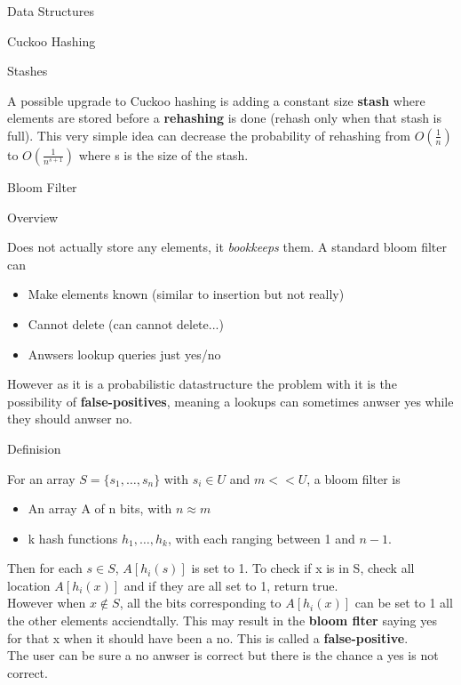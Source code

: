 \documentclass[12pt, letterpaper]{article}
\begin{document}
\begin{section}{Data Structures}
\begin{subsection}{Cuckoo Hashing}
    \begin{subsubsection}{Stashes}

      A possible upgrade to Cuckoo hashing is adding a constant size
      \textbf{stash} where elements are stored before a \textbf{rehashing} is
      done (rehash only when that stash is full). This very simple idea can
      decrease the probability of rehashing from \(O(\frac{1}{n})\) to
      \(O(\frac{1}{n^{s + 1}})\) where s is the size of the stash.

    \end{subsubsection}

  \end{subsection}

  \begin{subsection}{Bloom Filter}

    \begin{subsubsection}{Overview}

      Does not actually store any elements, it \textit{bookkeeps} them.
      A standard bloom filter can
      \begin{itemize}
        \item Make elements known (similar to insertion but not really)
        \item Cannot delete (can cannot delete...)
        \item Anwsers lookup queries just yes/no
      \end{itemize}

      However as it is a probabilistic datastructure the problem with it is the
      possibility of \textbf{false-positives}, meaning a lookups can sometimes
      anwser yes  while they should anwser no.

    \end{subsubsection}

    \begin{subsubsection}{Definision}

      For an array \(S = \{ s_{1}, \dots , s_{n} \}\) with \(s_{i} \in U\) and
      \(m << U\), a bloom filter is
      \begin{itemize}
        \item An array A of n bits, with \(n \approx m\)
        \item k hash functions \(h_{1}, \dots , h_{k}\), with each ranging
              between 1 and \(n - 1\).
      \end{itemize}
      Then for each \(s \in S\), \(A[h_{i}(s)]\) is set to 1. To check if x is
      in S, check all location \(A[h_{i}(x)]\) and if they are all set to 1,
      return true. \\
      However when \(x \notin S\), all the bits corresponding to
      \(A[h_{i}(x)]\) can be set to 1 all the other elements acciendtally. This
      may result in the \textbf{bloom flter} saying yes for that x when it
      should have been a no. This is called a \textbf{false-positive}. \\
      The user can be sure a no anwser is correct but there is the chance a yes
      is not correct.


\end{subsubsection}
\end{subsection}
\end{section}
\end{document}
